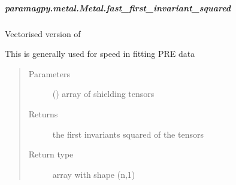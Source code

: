 \documentclass[a4paper,10pt,english,openany,oneside]{sphinxmanual}
\begin{document}
\begin{fulllineitems}
\begin{fulllineitems}
\begin{fulllineitems}
\end{fulllineitems}



\subparagraph{paramagpy.metal.Metal.fast\_first\_invariant\_squared}
\label{\detokenize{reference/generated/paramagpy.metal.Metal.fast_first_invariant_squared:paramagpy-metal-metal-fast-first-invariant-squared}}\label{\detokenize{reference/generated/paramagpy.metal.Metal.fast_first_invariant_squared::doc}}

\begin{fulllineitems}
\label{\detokenize{reference/generated/paramagpy.metal.Metal.fast_first_invariant_squared:paramagpy.metal.Metal.fast_first_invariant_squared}}
\sphinxAtStartPar
Vectorised version of
{\hyperref[\detokenize{reference/generated/paramagpy.metal.Metal.first_invariant_squared:paramagpy.metal.Metal.first_invariant_squared}]{}}

\sphinxAtStartPar
This is generally used for speed in fitting PRE data
\begin{quote}\begin{description}
\item[{Parameters}] \leavevmode
\sphinxAtStartPar
{} (\sphinxstyleliteralemphasis{\sphinxupquote{ (}}\sphinxstyleliteralemphasis{\sphinxupquote{,}}\sphinxstyleliteralemphasis{\sphinxupquote{,}}\sphinxstyleliteralemphasis{\sphinxupquote{)}}) \textendash{} array of shielding tensors

\item[{Returns}] \leavevmode
\sphinxAtStartPar
{} \textendash{} the first invariants squared of the tensors

\item[{Return type}] \leavevmode
\sphinxAtStartPar
array with shape (n,1)

\end{description}\end{quote}


\end{fulllineitems}
\end{fulllineitems}
\end{fulllineitems}
\end{document}
